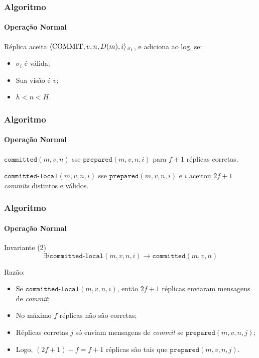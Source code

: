 \documentclass{beamer}
\begin{document}
\begin{frame}
  \frametitle{Algoritmo}
  \framesubtitle{Operação Normal}

  Réplica aceita $\braket{\text{COMMIT}, v, n, D(m), i}{}_{\sigma_i}$, e adiciona ao log, se:
  \begin{itemize}
    \item
      $\sigma_i$ é válida;

    \item
      Sua visão é $v$;

    \item
      $h < n < H$.
  \end{itemize}
\end{frame}

\begin{frame}
  \frametitle{Algoritmo}
  \framesubtitle{Operação Normal}

  $\texttt{committed}(m, v, n)$ sse $\texttt{prepared}(m, v, n, i)$ para $f + 1$ réplicas corretas.

  \hspace{1.5pt}

  $\texttt{committed-local}(m, v, n, i)$ sse $\texttt{prepared}(m, v, n, i)$ e $i$ aceitou $2f + 1$ \textit{commits} distintos e válidos.
\end{frame}

\begin{frame}
  \frametitle{Algoritmo}
  \framesubtitle{Operação Normal}

  \begin{block}{Invariante (2)}
    $$\exists i \texttt{committed-local}(m, v, n, i) \to \texttt{committed}(m, v, n)$$
  \end{block}

  Razão:
  \begin{itemize}
    \item
      Se $\texttt{committed-local}(m, v, n, i)$, então $2f + 1$ réplicas enviaram mensagens de \textit{commit};

    \item
      No máximo $f$ réplicas não são corretas;

    \item
      Réplicas corretas $j$ só enviam mensagens de \textit{commit} se $\texttt{prepared}(m, v, n, j)$;

    \item
      Logo, $(2f + 1) - f = f + 1$ réplicas são tais que $\texttt{prepared}(m, v, n, j)$.
  \end{itemize}
\end{frame}
\end{document}
